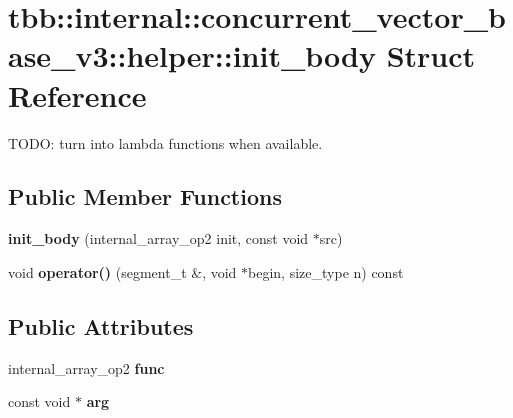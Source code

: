 \hypertarget{structtbb_1_1internal_1_1concurrent__vector__base__v3_1_1helper_1_1init__body}{}\section{tbb\+:\+:internal\+:\+:concurrent\+\_\+vector\+\_\+base\+\_\+v3\+:\+:helper\+:\+:init\+\_\+body Struct Reference}
\label{structtbb_1_1internal_1_1concurrent__vector__base__v3_1_1helper_1_1init__body}


T\+O\+D\+O\+: turn into lambda functions when available.  


\subsection*{Public Member Functions}
\begin{DoxyCompactItemize}
\item 
\hypertarget{structtbb_1_1internal_1_1concurrent__vector__base__v3_1_1helper_1_1init__body_a431f93c9a39f9fc12d3d06122179bf32}{}{\bfseries init\+\_\+body} (internal\+\_\+array\+\_\+op2 init, const void $\ast$src)\label{structtbb_1_1internal_1_1concurrent__vector__base__v3_1_1helper_1_1init__body_a431f93c9a39f9fc12d3d06122179bf32}

\item 
\hypertarget{structtbb_1_1internal_1_1concurrent__vector__base__v3_1_1helper_1_1init__body_a9f64d83796c7a143272c37c410af2f56}{}void {\bfseries operator()} (segment\+\_\+t \&, void $\ast$begin, size\+\_\+type n) const \label{structtbb_1_1internal_1_1concurrent__vector__base__v3_1_1helper_1_1init__body_a9f64d83796c7a143272c37c410af2f56}

\end{DoxyCompactItemize}
\subsection*{Public Attributes}
\begin{DoxyCompactItemize}
\item 
\hypertarget{structtbb_1_1internal_1_1concurrent__vector__base__v3_1_1helper_1_1init__body_aa5496a0e1a12f8988210f45d8caf4beb}{}internal\+\_\+array\+\_\+op2 {\bfseries func}\label{structtbb_1_1internal_1_1concurrent__vector__base__v3_1_1helper_1_1init__body_aa5496a0e1a12f8988210f45d8caf4beb}

\item 
\hypertarget{structtbb_1_1internal_1_1concurrent__vector__base__v3_1_1helper_1_1init__body_a44e623488caf7b38ac781597059e8b77}{}const void $\ast$ {\bfseries arg}\label{structtbb_1_1internal_1_1concurrent__vector__base__v3_1_1helper_1_1init__body_a44e623488caf7b38ac781597059e8b77}

\end{DoxyCompactItemize}


